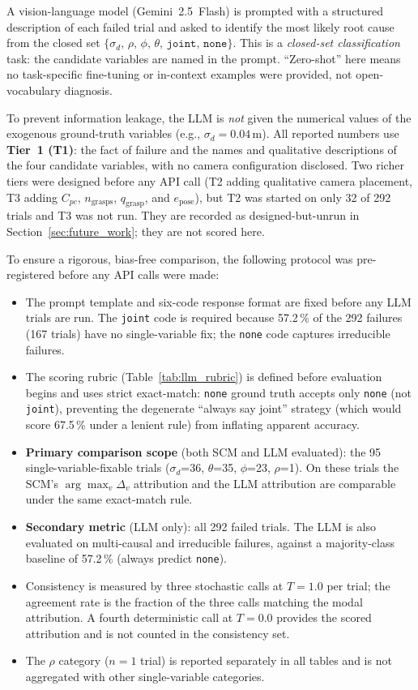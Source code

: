 \documentclass[11pt,a4paper]{report}
\begin{document}
A vision-language model (Gemini~2.5~Flash) is prompted with a structured description of each
failed trial and asked to identify the most likely root cause from the closed set
$\{\sigma_d,\,\rho,\,\phi,\,\theta,\,\texttt{joint},\,\texttt{none}\}$.
This is a \emph{closed-set classification} task: the candidate variables are named in the
prompt. ``Zero-shot'' here means no task-specific fine-tuning or in-context examples were
provided, not open-vocabulary diagnosis.

To prevent information leakage, the LLM is \emph{not} given the numerical values of the
exogenous ground-truth variables (e.g., $\sigma_d = 0.04$\,m). All reported numbers use
\textbf{Tier~1 (T1)}: the fact of failure and the names and qualitative descriptions of
the four candidate variables, with no camera configuration disclosed. Two richer tiers
were designed before any API call (T2 adding qualitative camera placement, T3 adding
$C_{pc}$, $n_{\text{grasps}}$, $q_{\text{grasp}}$, and $e_{\text{pose}}$), but T2 was
started on only 32 of 292 trials and T3 was not run. They are recorded as designed-but-unrun
in Section~\ref{sec:future_work}; they are not scored here.


To ensure a rigorous, bias-free comparison, the following protocol was pre-registered before
any API calls were made:

\begin{itemize}
  \item The prompt template and six-code response format are fixed before any LLM trials
    are run. The \texttt{joint} code is required because 57.2\,\% of the 292 failures
    (167 trials) have no single-variable fix; the \texttt{none} code captures irreducible
    failures.
  \item The scoring rubric (Table~\ref{tab:llm_rubric}) is defined before evaluation begins
    and uses strict exact-match: \texttt{none} ground truth accepts only \texttt{none}
    (not \texttt{joint}), preventing the degenerate ``always say joint'' strategy
    (which would score 67.5\,\% under a lenient rule) from inflating apparent accuracy.
  \item \textbf{Primary comparison scope} (both SCM and LLM evaluated): the 95
    single-variable-fixable trials ($\sigma_d$=36, $\theta$=35, $\phi$=23, $\rho$=1).
    On these trials the SCM's $\arg\max_v \Delta_v$ attribution and the LLM attribution
    are comparable under the same exact-match rule.
  \item \textbf{Secondary metric} (LLM only): all 292 failed trials. The LLM is also
    evaluated on multi-causal and irreducible failures, against a majority-class baseline
    of 57.2\,\% (always predict \texttt{none}).
  \item Consistency is measured by three stochastic calls at $T=1.0$ per trial; the
    agreement rate is the fraction of the three calls matching the modal attribution.
    A fourth deterministic call at $T=0.0$ provides the scored attribution and is
    not counted in the consistency set.
  \item The $\rho$ category ($n=1$ trial) is reported separately in all tables and is
    not aggregated with other single-variable categories.
\end{itemize}
\end{document}
